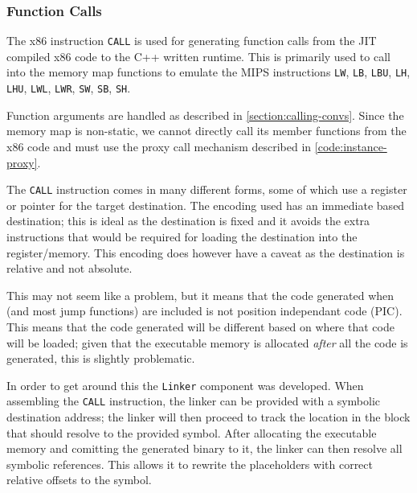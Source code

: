 \subsubsection{Function Calls}

The x86 instruction \texttt{CALL} \cite{x86-call} is used for generating function calls from the JIT compiled x86 code to the C++ written runtime. This is primarily used to call into the memory map functions to emulate the MIPS instructions \texttt{LW}, \texttt{LB}, \texttt{LBU}, \texttt{LH}, \texttt{LHU}, \texttt{LWL}, \texttt{LWR}, \texttt{SW}, \texttt{SB}, \texttt{SH}.

Function arguments are handled as described in \autoref{section:calling-convs}. Since the memory map is non-static, we cannot directly call its member functions from the x86 code and must use the proxy call mechanism described in \autoref{code:instance-proxy}.

The \texttt{CALL} instruction comes in many different forms, some of which use a register or pointer for the target destination. The encoding used has an immediate based destination; this is ideal as the destination is fixed and it avoids the extra instructions that would be required for loading the destination into the register/memory. This encoding does however have a caveat as the destination is relative and not absolute.

This may not seem like a problem, but it means that the code generated when  (and most jump functions) are included is not position independant code (PIC). This means that the code generated will be different based on where that code will be loaded; given that the executable memory is allocated \textit{after} all the code is generated, this is slightly problematic.

In order to get around this the \texttt{Linker} component was developed. When assembling the \texttt{CALL} instruction, the linker can be provided with a symbolic destination address; the linker will then proceed to track the location in the block that should resolve to the provided symbol. After allocating the executable memory and comitting the generated binary to it, the linker can then resolve all symbolic references. This allows it to rewrite the placeholders with correct relative offsets to the symbol.
